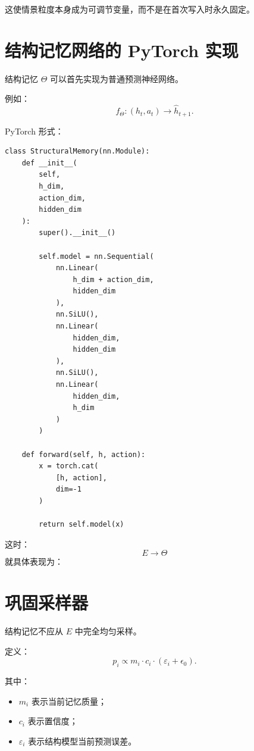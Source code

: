这使情景粒度本身成为可调节变量，而不是在首次写入时永久固定。

\section{结构记忆网络的 PyTorch 实现}

结构记忆 $\Theta$ 可以首先实现为普通预测神经网络。

例如：
\[
f_\Theta:
(h_t,a_t)
\rightarrow
\hat h_{t+1}.
\]

PyTorch 形式：

\begin{verbatim}
class StructuralMemory(nn.Module):
    def __init__(
        self,
        h_dim,
        action_dim,
        hidden_dim
    ):
        super().__init__()

        self.model = nn.Sequential(
            nn.Linear(
                h_dim + action_dim,
                hidden_dim
            ),
            nn.SiLU(),
            nn.Linear(
                hidden_dim,
                hidden_dim
            ),
            nn.SiLU(),
            nn.Linear(
                hidden_dim,
                h_dim
            )
        )

    def forward(self, h, action):
        x = torch.cat(
            [h, action],
            dim=-1
        )

        return self.model(x)
\end{verbatim}

这时：
\[
\boxed{
E\rightarrow\Theta
}
\]
就具体表现为：
\begin{statementbox}
\centering
{}
\end{statementbox}

\section{巩固采样器}

结构记忆不应从 $E$ 中完全均匀采样。

定义：
\[
p_i
\propto
m_i
\cdot
c_i
\cdot
(\varepsilon_i+\epsilon_0).
\]

其中：

\begin{itemize}
    \item $m_i$ 表示当前记忆质量；
    \item $c_i$ 表示置信度；
    \item $\varepsilon_i$ 表示结构模型当前预测误差。
\end{itemize}

